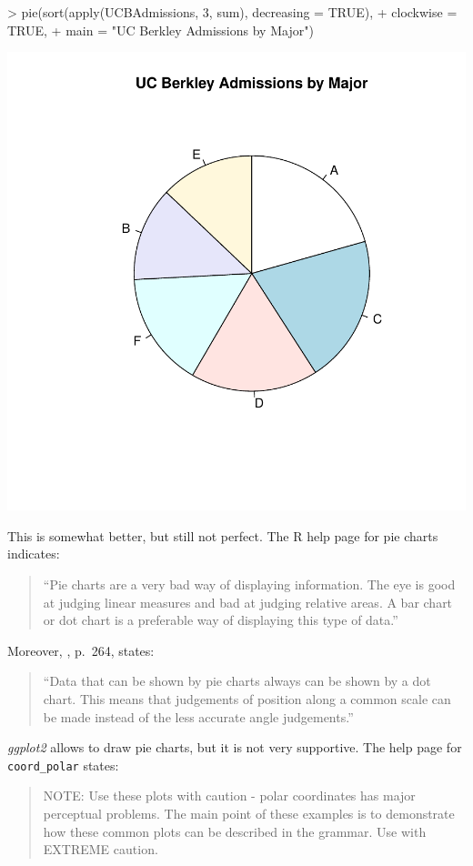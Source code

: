 \documentclass[12pt,letterpaper,final]{article}
\begin{document}
\begin{Schunk}
\begin{Sinput}
> pie(sort(apply(UCBAdmissions, 3, sum), decreasing = TRUE), 
+     clockwise = TRUE,
+     main = "UC Berkley Admissions by Major")
\end{Sinput}
\end{Schunk}
\includegraphics{lect_main-007}

This is somewhat better, but still not perfect. The R help page for pie charts
indicates:
\begin{quotation}
``Pie charts are a very bad way of displaying information. The eye is good 
at judging linear measures and bad at judging relative areas. A bar chart or 
dot chart is a preferable way of displaying this type of data.''
\end{quotation}

Moreover, \cite{Cle85}, p.~264, states: 
\begin{quotation}
``Data that can be shown by pie charts always can be shown by a dot chart. 
This means that judgements of position along a common scale can 
be made instead of the less accurate angle judgements.''
\end{quotation}


{\it ggplot2} allows to draw pie charts, but it is not very supportive.
The help  page for \verb|coord_polar| states:
\begin{quotation}
NOTE: Use these plots with caution - polar coordinates has
major perceptual problems.  The main point of these examples is
to demonstrate how these common plots can be described in the
grammar.  Use with EXTREME caution.
\end{quotation}
\end{document}

